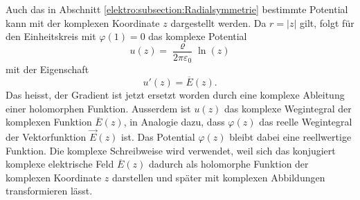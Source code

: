 Auch das in Abschnitt \ref{elektro:subsection:Radialsymmetrie} bestimmte Potential kann mit der komplexen Koordinate $z$ dargestellt werden.
Da $r=\lvert z \rvert$ gilt, folgt für den Einheitskreis mit $\varphi(1)=0$ das komplexe Potential
\begin{equation*}
    u(z)
    = \frac{\varrho}{2\pi\varepsilon_0}\ln(z)
\end{equation*}
mit der Eigenschaft
\begin{equation*}
	u'(z) = \overline{E}(z).
\end{equation*}
Das heisst, der Gradient ist jetzt ersetzt worden durch eine komplexe Ableitung einer holomorphen Funktion. 
Ausserdem ist $u(z)$ das komplexe Wegintegral der komplexen Funktion $\overline{E}(z)$, in Analogie dazu, dass $\varphi(z)$ das reelle Wegintegral der Vektorfunktion $\vec{E}(z)$ ist.
Das Potential $\varphi(z)$ bleibt dabei eine reellwertige Funktion.
Die komplexe Schreibweise wird verwendet, weil sich das konjugiert komplexe elektrische Feld $\overline{E}(z)$ dadurch als holomorphe Funktion der komplexen Koordinate $z$ darstellen und später mit komplexen Abbildungen transformieren lässt.

